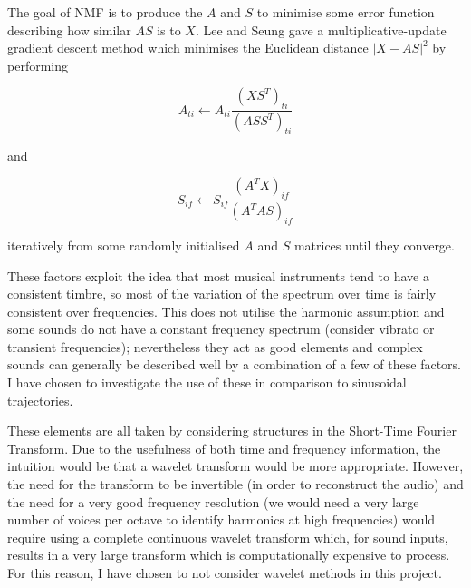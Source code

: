 \documentclass[12pt,a4paper,twoside,openright]{report}
\begin{document}
The goal of NMF is to produce the $ A $ and $ S $ to minimise some error function describing how similar $ AS $ is to $ X $. Lee and Seung \cite{lee2001algorithms} gave a multiplicative-update gradient descent method which minimises the Euclidean distance $ \left| X - AS \right|^2 $ by performing

\begin{equation}
A_{ti} \leftarrow A_{ti} \frac{\left( X S^T \right)_{ti}}{\left( A S S^T \right)_{ti}}
\label{NMFA}
\end{equation}

and

\begin{equation}
S_{if} \leftarrow S_{if} \frac{\left( A^T X \right)_{if}}{\left( A^T A S \right)_{if}}
\label{NMFS}
\end{equation}

iteratively from some randomly initialised $ A $ and $ S $ matrices until they converge.

These factors exploit the idea that most musical instruments tend to have a consistent timbre, so most of the variation of the spectrum over time is fairly consistent over frequencies. This does not utilise the harmonic assumption and some sounds do not have a constant frequency spectrum (consider vibrato or transient frequencies); nevertheless they act as good elements and complex sounds can generally be described well by a combination of a few of these factors. I have chosen to investigate the use of these in comparison to sinusoidal trajectories.



These elements are all taken by considering structures in the Short-Time Fourier Transform. Due to the usefulness of both time and frequency information, the intuition would be that a wavelet transform would be more appropriate. However, the need for the transform to be invertible (in order to reconstruct the audio) and the need for a very good frequency resolution (we would need a very large number of voices per octave to identify harmonics at high frequencies) would require using a complete continuous wavelet transform which, for sound inputs, results in a very large transform which is computationally expensive to process. For this reason, I have chosen to not consider wavelet methods in this project.
\end{document}
